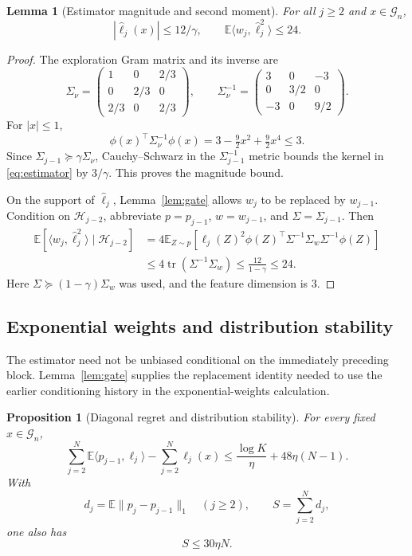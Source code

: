 \documentclass[11pt]{article}
\newtheorem{lemma}[theorem]{Lemma}
\newtheorem{proposition}[theorem]{Proposition}
\theoremstyle{definition}
\newcommand{\E}{\mathbb E}
\newcommand{\la}{\langle}
\newcommand{\ra}{\rangle}
\begin{document}
\begin{lemma}[Estimator magnitude and second moment]\label{lem:moments}
For all $j\geq2$ and $x\in\mathcal G_n$,
\[
 |\widehat\ell_j(x)|\leq12/\gamma,
 \qquad
 \E\la w_j,\widehat\ell_j^2\ra\leq24.
\]
\end{lemma}

\begin{proof}
The exploration Gram matrix and its inverse are
\[
 \Sigma_\nu=
 \begin{pmatrix}1&0&2/3\\0&2/3&0\\2/3&0&2/3\end{pmatrix},
 \qquad
 \Sigma_\nu^{-1}=
 \begin{pmatrix}3&0&-3\\0&3/2&0\\-3&0&9/2\end{pmatrix}.
\]
For $|x|\leq1$,
\[
 \phi(x)^\top\Sigma_\nu^{-1}\phi(x)
 =3-\tfrac92x^2+\tfrac92x^4\leq3.
\]
Since $\Sigma_{j-1}\succeq\gamma\Sigma_\nu$, Cauchy--Schwarz in the $\Sigma_{j-1}^{-1}$ metric bounds the kernel in \eqref{eq:estimator} by $3/\gamma$. This proves the magnitude bound.

On the support of $\widehat\ell_j$, Lemma~\ref{lem:gate} allows $w_j$ to be replaced by $w_{j-1}$. Condition on $\mathcal H_{j-2}$, abbreviate $p=p_{j-1}$, $w=w_{j-1}$, and $\Sigma=\Sigma_{j-1}$. Then
\begin{align*}
 \E[\la w_j,\widehat\ell_j^2\ra\mid\mathcal H_{j-2}]
 &=4\E_{Z\sim p}\left[\ell_j(Z)^2
      \phi(Z)^\top\Sigma^{-1}\Sigma_w\Sigma^{-1}\phi(Z)\right]\\
 &\leq4\operatorname{tr}(\Sigma^{-1}\Sigma_w)
 \leq\frac{12}{1-\gamma}\leq24.
\end{align*}
Here $\Sigma\succeq(1-\gamma)\Sigma_w$ was used, and the feature dimension is $3$.
\end{proof}

\subsection{Exponential weights and distribution stability}

The estimator need not be unbiased conditional on the immediately preceding block. Lemma~\ref{lem:gate} supplies the replacement identity needed to use the earlier conditioning history in the exponential-weights calculation.

\begin{proposition}[Diagonal regret and distribution stability]\label{prop:ew}
For every fixed $x\in\mathcal G_n$,
\begin{equation}\label{eq:diagonal-regret}
 \sum_{j=2}^N\E\la p_{j-1},\ell_j\ra-\sum_{j=2}^N\ell_j(x)
 \leq\frac{\log K}{\eta}+48\eta(N-1).
\end{equation}
With
\[
 d_j=\E\|p_j-p_{j-1}\|_1\quad(j\geq2),
 \qquad S=\sum_{j=2}^N d_j,
\]
one also has
\begin{equation}\label{eq:stability}
 S\leq30\eta N.
\end{equation}

\end{proposition}
\end{document}
